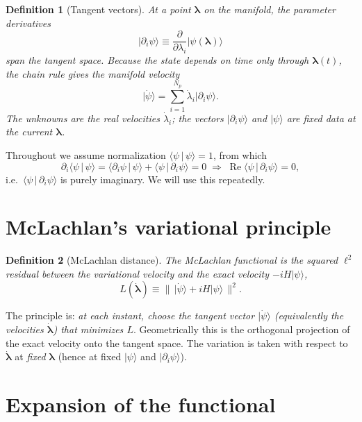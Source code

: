 \documentclass[12pt,a4paper]{article}
\newcommand{\ket}[1]{\lvert #1 \rangle}
\newcommand{\braket}[2]{\langle #1 \,|\, #2 \rangle}
\newcommand{\re}{\operatorname{Re}}
\newcommand{\dlam}{\dot{\boldsymbol{\lambda}}}
\newtheorem{definition}{Definition}[section]
\begin{document}
\begin{definition}[Tangent vectors]
At a point $\boldsymbol{\lambda}$ on the manifold, the \emph{parameter derivatives}
\[
  \ket{\partial_i\psi}\equiv\frac{\partial}{\partial\lambda_i}\ket{\psi(\boldsymbol{\lambda})}
\]
span the tangent space. Because the state depends on time only through $\boldsymbol{\lambda}(t)$,
the chain rule gives the manifold velocity
\begin{equation}
  \ket{\dot\psi}=\sum_{i=1}^{N_p}\dot\lambda_i\ket{\partial_i\psi}.
  \label{eq:vel}
\end{equation}
The unknowns are the \emph{real} velocities $\dot\lambda_i$; the vectors $\ket{\partial_i\psi}$ and
$\ket{\psi}$ are fixed data at the current $\boldsymbol{\lambda}$.
\end{definition}

Throughout we assume normalization $\braket{\psi}{\psi}=1$, from which
\begin{equation}
  \partial_i\braket{\psi}{\psi}=\braket{\partial_i\psi}{\psi}+\braket{\psi}{\partial_i\psi}=0
  \;\Longrightarrow\;
  \re\braket{\psi}{\partial_i\psi}=0,
  \label{eq:normid}
\end{equation}
i.e.\ $\braket{\psi}{\partial_i\psi}$ is purely imaginary. We will use this repeatedly.

\section{McLachlan's variational principle}\label{sec:mvp}

\begin{definition}[McLachlan distance]
The \emph{McLachlan functional} is the squared $\ell^2$ residual between the variational
velocity and the exact velocity $-iH\ket{\psi}$,
\begin{equation}
  L(\dlam)\equiv\Big\|\,\ket{\dot\psi}+iH\ket{\psi}\,\Big\|^2 .
  \label{eq:Lfunc}
\end{equation}
\end{definition}

The principle is: \emph{at each instant, choose the tangent vector $\ket{\dot\psi}$ (equivalently the
velocities $\dlam$) that minimizes $L$}. Geometrically this is the orthogonal projection of the exact
velocity onto the tangent space. The variation is taken with respect to $\dlam$ at \emph{fixed}
$\boldsymbol{\lambda}$ (hence at fixed $\ket{\psi}$ and $\ket{\partial_i\psi}$).

\section{Expansion of the functional}\label{sec:expand}
\end{document}
